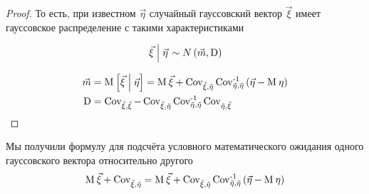 \begin{proof}
    То есть, при известном $\vec{\eta}$ случайный гауссовский вектор
    $\vec{\xi}$ имеет гауссовское распределение с такими характеристиками

    $$\left. \vec{\xi} \mcond \vec{\eta} \right. \sim N\left( \vec{m},
        \operatorname{D} \right)$$
    
    \begin{align*}
    \vec{m}
        &= \Mean{\vec{\xi} \mcond \vec{\eta}}
        = \mean{\vec{\xi}} + \Cov{\vec{\xi}}{\vec{\eta}}
            \dCov[-1]{\vec{\eta}}\left( \vec{\eta} - \mean{\eta} \right) \\
    \operatorname{D}
        &= \dCov{\vec{\xi}} - \Cov{\vec{\xi}}{\vec{\eta}} \dCov[-1]{\vec{\eta}}
            \Cov{\vec{\eta}}{\vec{\xi}}
    \end{align*}
\end{proof}

\begin{remark}\label{remark:gaussianVector:conditionalExpectation}
    Мы получили формулу для подсчёта условного математического ожидания одного
    гауссовского вектора относительно другого
    \begin{align*}
    \mean{\vec{\xi}} + \Cov{\vec{\xi}}{\vec{\eta}}
    = \mean{\vec{\xi}} + \Cov{\vec{\xi}}{\vec{\eta}}
            \dCov[-1]{\vec{\eta}}\left( \vec{\eta} - \mean{\eta} \right)
    \end{align*}
\end{remark}
